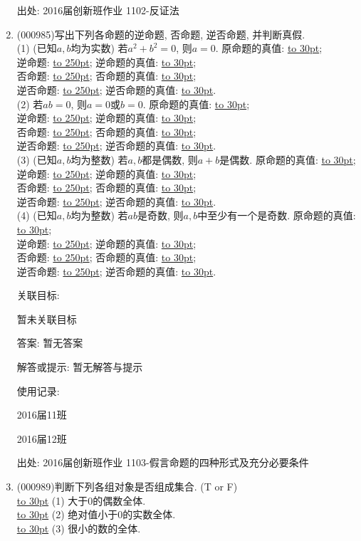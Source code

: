 \documentclass[10pt,a4paper]{article}
\newcommand{\blank}[1]{\underline{\hbox to #1pt{}}}
\begin{document}
\begin{enumerate}[1.]
出处: 2016届创新班作业	1102-反证法
\item { (000985)}写出下列各命题的逆命题, 否命题, 逆否命题, 并判断真假.\\ 
(1) (已知$a,b$均为实数) 若$a^2+b^2=0$, 则$a=0$. 原命题的真值: \blank{30};\\ 
逆命题: \blank{250}; 逆命题的真值: \blank{30};\\ 
否命题: \blank{250}; 否命题的真值: \blank{30};\\ 
逆否命题: \blank{250}; 逆否命题的真值: \blank{30}.\\ 
(2) 若$ab=0$, 则$a=0$或$b=0$. 原命题的真值: \blank{30};\\ 
逆命题: \blank{250}; 逆命题的真值: \blank{30};\\ 
否命题: \blank{250}; 否命题的真值: \blank{30};\\ 
逆否命题: \blank{250}; 逆否命题的真值: \blank{30}.\\ 
(3) (已知$a,b$均为整数) 若$a,b$都是偶数, 则$a+b$是偶数. 原命题的真值: \blank{30};\\ 
逆命题: \blank{250}; 逆命题的真值: \blank{30};\\ 
否命题: \blank{250}; 否命题的真值: \blank{30};\\ 
逆否命题: \blank{250}; 逆否命题的真值: \blank{30}.\\ 
(4) (已知$a,b$均为整数) 若$ab$是奇数, 则$a,b$中至少有一个是奇数. 原命题的真值: \blank{30};\\ 
逆命题: \blank{250}; 逆命题的真值: \blank{30};\\ 
否命题: \blank{250}; 否命题的真值: \blank{30};\\ 
逆否命题: \blank{250}; 逆否命题的真值: \blank{30}.


关联目标:

暂未关联目标

答案: 暂无答案

解答或提示: 暂无解答与提示

使用记录:

2016届11班				

2016届12班				


出处: 2016届创新班作业	1103-假言命题的四种形式及充分必要条件
\item { (000989)}判断下列各组对象是否组成集合. (T or F)\\ 
\blank{30} (1) 大于$0$的偶数全体.\\ 
\blank{30} (2) 绝对值小于$0$的实数全体.\\ 
\blank{30} (3) 很小的数的全体.



\end{enumerate}
\end{document}
